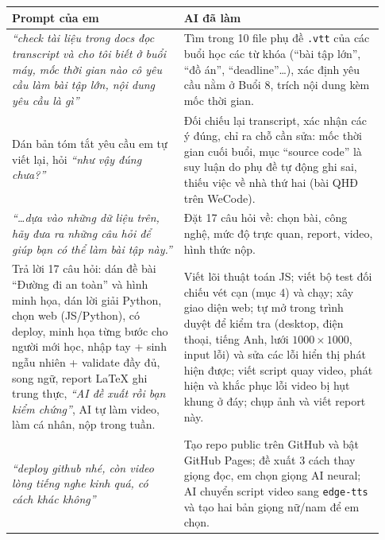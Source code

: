 \documentclass[12pt,a4paper]{article}
\begin{document}
\begin{longtable}{>{\raggedright\arraybackslash}p{0.43\linewidth} >{\raggedright\arraybackslash}p{0.5\linewidth}}
\toprule
\textbf{Prompt của em} & \textbf{AI đã làm}\\\midrule\endhead
\textit{``check tài liệu trong docs đọc transcript và cho tôi biết ở buổi máy, mốc thời gian nào cô yêu cầu làm bài tập lớn, nội dung yêu cầu là gì''} &
Tìm trong 10 file phụ đề \texttt{.vtt} của các buổi học các từ khóa (``bài tập lớn'', ``đồ án'', ``deadline''\dots), xác định yêu cầu nằm ở Buổi 8, trích nội dung kèm mốc thời gian.\\\midrule
Dán bản tóm tắt yêu cầu em tự viết lại, hỏi \textit{``như vậy đúng chưa?''} &
Đối chiếu lại transcript, xác nhận các ý đúng, chỉ ra chỗ cần sửa: mốc thời gian cuối buổi, mục ``source code'' là suy luận do phụ đề tự động ghi sai, thiếu việc về nhà thứ hai (bài QHĐ trên WeCode).\\\midrule
\textit{``\dots dựa vào những dữ liệu trên, hãy đưa ra những câu hỏi để giúp bạn có thể làm bài tập này.''} &
Đặt 17 câu hỏi về: chọn bài, công nghệ, mức độ trực quan, report, video, hình thức nộp.\\\midrule
Trả lời 17 câu hỏi: dán đề bài ``Đường đi an toàn'' và hình minh họa, dán lời giải Python, chọn web (JS/Python), có deploy, minh họa từng bước cho người mới học, nhập tay + sinh ngẫu nhiên + validate đầy đủ, song ngữ, report LaTeX ghi trung thực, \textit{``AI đề xuất rồi bạn kiểm chứng''}, AI tự làm video, làm cá nhân, nộp trong tuần. &
Viết lõi thuật toán JS; viết bộ test đối chiếu vét cạn (mục 4) và chạy; xây giao diện web; tự mở trong trình duyệt để kiểm tra (desktop, điện thoại, tiếng Anh, lưới $1000\times1000$, input lỗi) và sửa các lỗi hiển thị phát hiện được; viết script quay video, phát hiện và khắc phục lỗi video bị hụt khung ở đáy; chụp ảnh và viết report này.\\\midrule
\textit{``deploy github nhé, còn video lòng tiếng nghe kinh quá, có cách khác không''} &
Tạo repo public trên GitHub và bật GitHub Pages; đề xuất 3 cách thay giọng đọc, em chọn giọng AI neural; AI chuyển script video sang \texttt{edge-tts} và tạo hai bản giọng nữ/nam để em chọn.\\
\bottomrule
\end{longtable}
\end{document}

